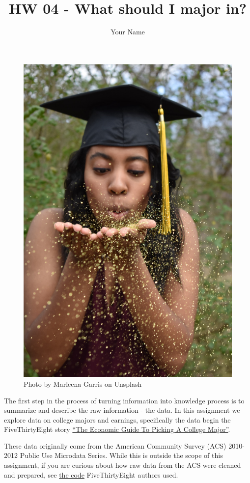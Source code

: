 \documentclass[
]{article}
\title{HW 04 - What should I major in?}
\author{Your Name}
\date{}
\begin{document}
\maketitle

{
\setcounter{tocdepth}{2}
\tableofcontents
}
\begin{figure}
\includegraphics[width=0.8\linewidth]{img/graduate} \caption{Photo by Marleena Garris on Unsplash}\label{fig:photo}
\end{figure}

The first step in the process of turning information into knowledge
process is to summarize and describe the raw information - the data. In
this assignment we explore data on college majors and earnings,
specifically the data begin the FiveThirtyEight story
\href{https://fivethirtyeight.com/features/the-economic-guide-to-picking-a-college-major/}{``The
Economic Guide To Picking A College Major''}.

These data originally come from the American Community Survey (ACS)
2010-2012 Public Use Microdata Series. While this is outside the scope
of this assignment, if you are curious about how raw data from the ACS
were cleaned and prepared, see
\href{https://github.com/fivethirtyeight/data/blob/master/college-majors/college-majors-rscript.R}{the
code} FiveThirtyEight authors used.
\end{document}
